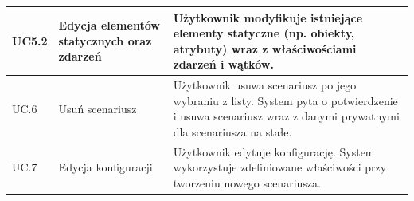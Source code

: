 \begin{longtable}{|p{1cm}|p{5cm}|p{9cm}|}
\hline
UC5.2 & Edycja elementów statycznych oraz zdarzeń & Użytkownik modyfikuje istniejące elementy statyczne (np. obiekty, atrybuty) wraz z właściwościami zdarzeń i wątków. \\
\hline
UC.6 & Usuń scenariusz & Użytkownik usuwa scenariusz po jego wybraniu z listy. System pyta o potwierdzenie i usuwa scenariusz wraz z danymi prywatnymi dla scenariusza na stałe. \\
\hline
UC.7 & Edycja konfiguracji & Użytkownik edytuje konfigurację. System wykorzystuje zdefiniowane właściwości przy tworzeniu nowego scenariusza. \\
\hline
\end{longtable}


